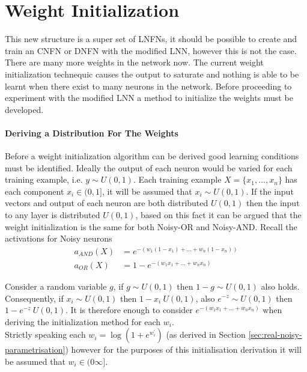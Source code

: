 

\section{Weight Initialization}

This new structure is a super set of LNFNs, it should be possible to create and train an CNFN or DNFN with the modified LNN, however this is not the case. There are many more weights in the network now. The current weight initialization technequic causes the output to saturate and nothing is able to be learnt when there exist to many neurons in the network. Before proceeding to experiment with the modified LNN a method to initialize the weights must be developed.\\

\paragraph{Deriving a Distribution For The Weights}
Before a weight initialization algorithm can be derived good learning conditions must be identified. Ideally the output of each neuron would be varied for each training example, i.e. $y \sim U(0,1)$. Each training example $X = \{x_1, ..., x_n\}$ has each component $x_i \in (0,1]$, it will be assumed that $x_i \sim U(0,1)$. If the input vectors and output of each neuron are both distributed $U(0,1)$ then the input to any layer is distributed $U(0,1)$, based on this fact it can be argued that the weight initialization is the same for both Noisy-OR and Noisy-AND. Recall the activations for Noisy neurons\\

\begin{align*}
	a_{AND}(X) &= e^{-(w_1(1 - x_1) + ... + w_n(1 - x_n))}\\
	a_{OR}(X) &= 1 - e^{-(w_1x_1 + ... + w_nx_n)}
\end{align*}

Consider a random variable $g$, if $g \sim U(0,1)$ then $1 - g \sim U(0,1)$ also holds. Consequently, if $x_i \sim U(0,1)$ then $1 - x_i ~ U(0,1)$, also $e^{-z} \sim U(0,1)$ then $1 - e^{-z} ~ U(0,1)$. It is therefore enough to consider $e^{-(w_1x_1 + ... + w_nx_n)}$ when deriving the initialization method for each $w_i$.\\

Strictly speaking each $w_i = \log(1 + e^{w^{'}_i})$ (as derived in Section \ref{sec:real-noisy-parametrisation}) however for the purposes of this initialisation derivation it will be assumed that $w_i \in (0 \infty]$.\\

